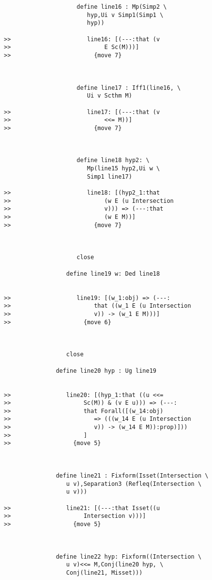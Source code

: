 \documentclass[12pt]{article}
\begin{document}
\begin{verbatim}
                     define line16 : Mp(Simp2 \
                        hyp,Ui v Simp1(Simp1 \
                        hyp))

>>                      line16: [(---:that (v
>>                           E Sc(M)))]
>>                        {move 7}



                     define line17 : Iff1(line16, \
                        Ui v Scthm M)

>>                      line17: [(---:that (v
>>                           <<= M))]
>>                        {move 7}



                     define line18 hyp2: \
                        Mp(line15 hyp2,Ui w \
                        Simp1 line17)

>>                      line18: [(hyp2_1:that
>>                           (w E (u Intersection
>>                           v))) => (---:that
>>                           (w E M))]
>>                        {move 7}



                     close

                  define line19 w: Ded line18


>>                   line19: [(w_1:obj) => (---:
>>                        that ((w_1 E (u Intersection
>>                        v)) -> (w_1 E M)))]
>>                     {move 6}



                  close

               define line20 hyp : Ug line19


>>                line20: [(hyp_1:that ((u <<=
>>                     Sc(M)) & (v E u))) => (---:
>>                     that Forall([(w_14:obj)
>>                        => (((w_14 E (u Intersection
>>                        v)) -> (w_14 E M)):prop)]))
>>                     ]
>>                  {move 5}



               define line21 : Fixform(Isset(Intersection \
                  u v),Separation3 (Refleq(Intersection \
                  u v)))

>>                line21: [(---:that Isset((u
>>                     Intersection v)))]
>>                  {move 5}



               define line22 hyp: Fixform((Intersection \
                  u v)<<= M,Conj(line20 hyp, \
                  Conj(line21, Misset)))


\end{verbatim}
\end{document}
